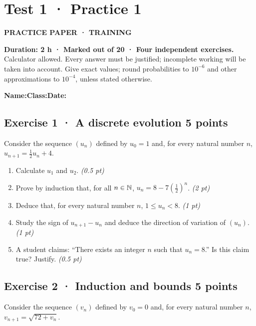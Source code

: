 \clearpage{}\label{sujet:1-1}

\section*{Test 1 · Practice 1}

{\sffamily\bfseries\color{teal}PRACTICE PAPER · TRAINING\par}

\textbf{Duration: 2 h · Marked out of 20 · Four independent exercises.}\\Calculator allowed. Every answer must be justified; incomplete working will be taken into account. Give exact values; round probabilities to $10^{-6}$ and other approximations to $10^{-4}$, unless stated otherwise.

\smallskip\textbf{Name:}\enspace\dotfill\quad\textbf{Class:}\enspace\dotfill\quad\textbf{Date:}\enspace\dotfill

\subsection*{Exercise 1 · A discrete evolution \hfill 5 points}Consider the sequence $(u_n)$ defined by $u_0=1$ and, for every natural number $n$, $u_{n+1}=\frac{1}{2}u_n+4$.

\begin{enumerate}

\item Calculate $u_1$ and $u_2$. \hfill\textit{(0.5 pt)}

\item Prove by induction that, for all $n\in\mathbb N$, $u_n=8-7\left(\frac{1}{2}\right)^n$. \hfill\textit{(2 pt)}

\item Deduce that, for every natural number $n$, $1\le u_n<8$. \hfill\textit{(1 pt)}

\item Study the sign of $u_{n+1}-u_n$ and deduce the direction of variation of $(u_n)$. \hfill\textit{(1 pt)}

\item A student claims: ``There exists an integer $n$ such that $u_n=8$.'' Is this claim true? Justify. \hfill\textit{(0.5 pt)}

\end{enumerate}

\subsection*{Exercise 2 · Induction and bounds \hfill 5 points}Consider the sequence $(v_n)$ defined by $v_0=0$ and, for every natural number $n$, $v_{n+1}=\sqrt{72+v_n}$.

